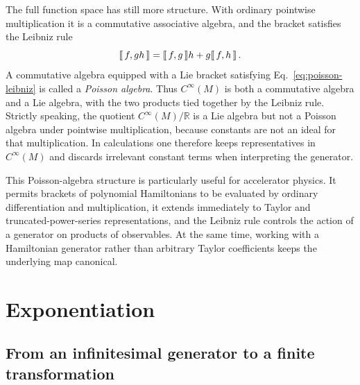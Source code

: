 The full function space has still more structure.  With ordinary pointwise
multiplication it is a commutative associative algebra, and the bracket
satisfies the Leibniz rule
\begin{equation}\label{eq:poisson-leibniz}
    \llbracket \, f,gh\,\rrbracket = \llbracket \, f,g\,\rrbracket h + g\llbracket \, f,h\,\rrbracket\,.
\end{equation}
A commutative algebra equipped with a Lie bracket satisfying
Eq.~\eqref{eq:poisson-leibniz} is called a \emph{Poisson algebra}.  Thus
$C^\infty(M)$ is both a commutative algebra and a Lie algebra, with the two
products tied together by the Leibniz rule.  Strictly speaking, the quotient
$C^\infty(M)/\mathbb{R}$ is a Lie algebra but not a Poisson algebra under
pointwise multiplication, because constants are not an ideal for that
multiplication.  In calculations one therefore keeps representatives in
$C^\infty(M)$ and discards irrelevant constant terms when interpreting the
generator.

This Poisson-algebra structure is particularly useful for accelerator
physics.  It permits brackets of polynomial Hamiltonians to be evaluated by
ordinary differentiation and multiplication, it extends immediately to
Taylor and truncated-power-series representations, and the Leibniz rule
controls the action of a generator on products of observables.  At the same
time, working with a Hamiltonian generator rather than arbitrary Taylor
coefficients keeps the underlying map canonical.



\section{Exponentiation}

\subsection{From an infinitesimal generator to a finite transformation}

